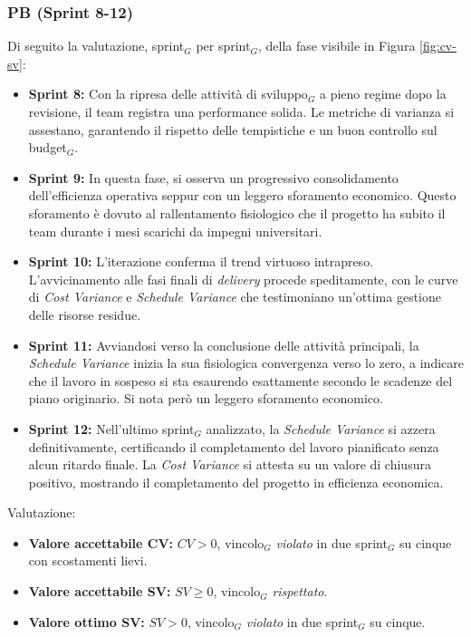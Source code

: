 \documentclass[a4paper, 10pt, colorlinks=true, linkcolor=black, urlcolor=blue, citecolor=blue, hidelinks]{article}
\begin{document}
\subsubsection{PB (Sprint 8-12)}
Di seguito la valutazione, sprint$_G$ per sprint$_G$, della fase visibile in Figura \ref{fig:cv-sv}:
\begin{itemize}
\item \textbf{Sprint 8:} Con la ripresa delle attività di sviluppo$_G$ a pieno regime dopo la revisione, il team registra una performance solida. Le metriche di varianza si assestano, garantendo il rispetto delle tempistiche e un buon controllo sul budget$_G$.
\item \textbf{Sprint 9:} In questa fase, si osserva un progressivo consolidamento dell'efficienza operativa seppur con un leggero sforamento economico. Questo sforamento è dovuto al rallentamento fisiologico che il progetto ha subito il team durante i mesi scarichi da impegni universitari.
\item \textbf{Sprint 10:} L'iterazione conferma il trend virtuoso intrapreso. L'avvicinamento alle fasi finali di \textit{delivery} procede speditamente, con le curve di \textit{Cost Variance} e \textit{Schedule Variance} che testimoniano un'ottima gestione delle risorse residue.
\item \textbf{Sprint 11:} Avviandosi verso la conclusione delle attività principali, la \textit{Schedule Variance} inizia la sua fisiologica convergenza verso lo zero, a indicare che il lavoro in sospeso si sta esaurendo esattamente secondo le scadenze del piano originario. Si nota però un leggero sforamento economico. 
\item \textbf{Sprint 12:} Nell'ultimo sprint$_G$ analizzato, la \textit{Schedule Variance} si azzera definitivamente, certificando il completamento del lavoro pianificato senza alcun ritardo finale. La \textit{Cost Variance} si attesta su un valore di chiusura positivo, mostrando il completamento del progetto in efficienza economica.
\end{itemize}
Valutazione: 
\begin{itemize}
    \item \textbf{Valore accettabile CV:} $CV>0$, vincolo$_G$ \textit{violato} in due sprint$_G$ su cinque con scostamenti lievi.
    \item \textbf{Valore accettabile SV:} $SV\geq 0$, vincolo$_G$ \textit{rispettato}.
    \item \textbf{Valore ottimo SV:} $SV > 0$, vincolo$_G$ \textit{violato} in due sprint$_G$ su cinque. 
\end{itemize}
\end{document}

